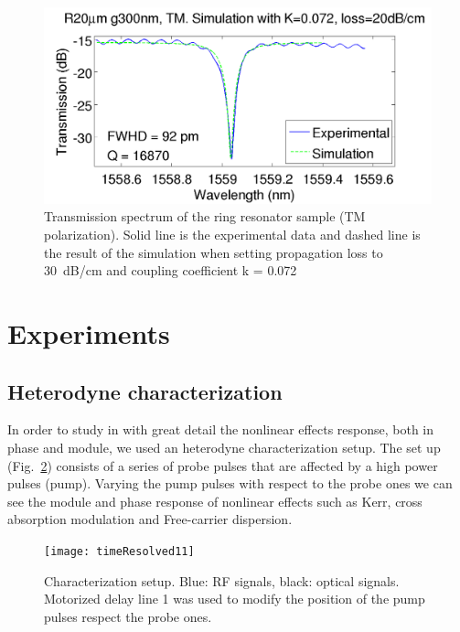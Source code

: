 \begin{figure}[htb]
    \centering
    \includegraphics[width=\fWidth\textwidth]{fit20um300nmBig_2}   
    \caption{Transmission spectrum of the ring resonator sample (TM polarization). Solid line is the experimental data and dashed line is the result of the simulation when setting propagation loss to 30~dB/cm and coupling coefficient k = 0.072}
    \label{fig:fit20um300nmBig}
\end{figure}


\section{Experiments}

\subsection{Heterodyne characterization}
In order to study in with great detail the nonlinear effects response, both in phase and module, we used an heterodyne characterization setup. The set up (Fig.~\ref{fig:timeResSetupSwitching}) consists of a series of probe pulses that are affected by a high power pulses (pump). Varying the pump pulses with respect to the probe ones we can see the module and phase response of nonlinear effects such as Kerr, cross absorption modulation and Free-carrier dispersion.


\begin{figure}[htb]
    \centering
    \texttt{[image: timeResolved11]}
    \caption{Characterization setup. Blue: RF signals, black: optical signals. Motorized delay line 1 was used to modify the position of the pump pulses respect the probe ones. }
    \label{fig:timeResSetupSwitching}
\end{figure}


